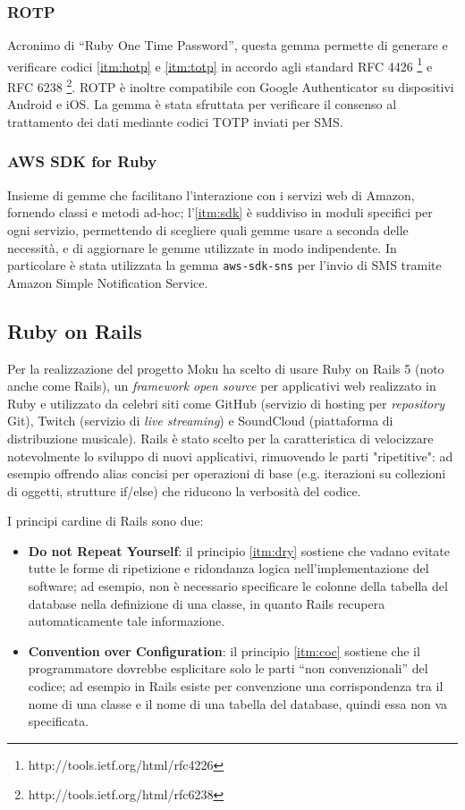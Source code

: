 \subsubsection{ROTP}
Acronimo di ``Ruby One Time Password'', questa gemma permette di generare e verificare codici \ref{itm:hotp} e \ref{itm:totp} in accordo agli standard RFC 4426 \footnote[1]{http://tools.ietf.org/html/rfc4226} e RFC 6238 \footnote[2]{http://tools.ietf.org/html/rfc6238}. ROTP è inoltre compatibile con Google Authenticator su dispositivi Android e iOS. La gemma è stata sfruttata per verificare il consenso al trattamento dei dati mediante codici TOTP inviati per SMS.

\subsubsection{AWS SDK for Ruby}
Insieme di gemme che facilitano l'interazione con i servizi web di Amazon, fornendo classi e metodi ad-hoc; l'\ref{itm:sdk} è suddiviso in moduli specifici per ogni servizio, permettendo di scegliere quali gemme usare a seconda delle necessità, e di aggiornare le gemme utilizzate in modo indipendente. In particolare è stata utilizzata la gemma \texttt{aws-sdk-sns} per l'invio di SMS tramite Amazon Simple Notification Service.

\subsection{Ruby on Rails}
\label{sec:2.2.3}
Per la realizzazione del progetto Moku ha scelto di usare Ruby on Rails 5 (noto anche come Rails), un \textit{framework} \textit{open source} per applicativi web realizzato in Ruby e utilizzato da celebri siti come GitHub (servizio di hosting per \textit{repository} Git), Twitch (servizio di \textit{live streaming}) e SoundCloud (piattaforma di distribuzione musicale). Rails è stato scelto per la caratteristica di velocizzare notevolmente lo sviluppo di nuovi applicativi, rimuovendo le parti "ripetitive": ad esempio offrendo alias concisi per operazioni di base (e.g. iterazioni su collezioni di oggetti, strutture if/else) che riducono la verbosità del codice.

I principi cardine di Rails sono due:
\begin{itemize}
    \item\textbf{Do not Repeat Yourself}: il principio \ref{itm:dry} sostiene che vadano evitate tutte le forme di ripetizione e ridondanza logica nell'implementazione del software; ad esempio, non è necessario specificare le colonne della tabella del database nella definizione di una classe, in quanto Rails recupera automaticamente tale informazione.
    \item\textbf{Convention over Configuration}: il principio \ref{itm:coc} sostiene che il programmatore dovrebbe esplicitare solo le parti ``non convenzionali'' del codice; ad esempio in Rails esiste per convenzione una corrispondenza tra il nome di una classe e il nome di una tabella del database, quindi essa non va specificata.
\end{itemize}
\vspace{-25pt}
